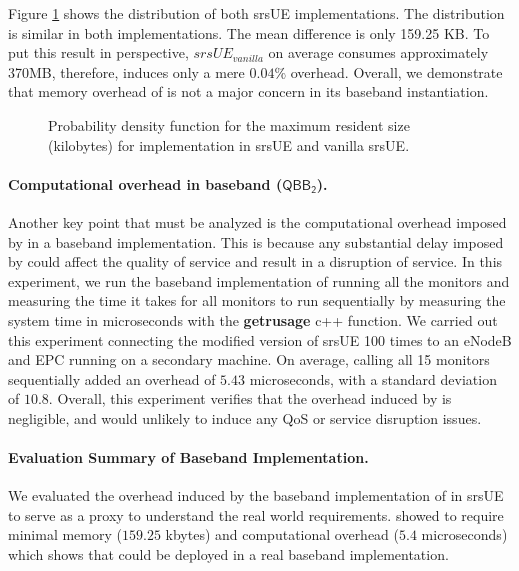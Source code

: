 Figure
\ref{fig:baseband_implementation_memory} shows the distribution of both srsUE
implementations. The
distribution is similar in both implementations. The mean difference is only
159.25 KB.
To
put this result in perspective, $srsUE_{vanilla}$ on average consumes approximately
370MB, therefore, \system induces only a mere $0.04\%$ overhead.
Overall, we demonstrate that memory overhead of \system is not a major concern
in its baseband instantiation.


\begin{figure}[t]
 \centering
 \resizebox{.8\columnwidth}{!}{}
 \caption{Probability density function for the maximum resident size (kilobytes) for \system implementation in srsUE\cite{gomez2016srslte} and vanilla srsUE.}
 \label{fig:baseband_implementation_memory}
\end{figure}
%

\paragraph{Computational overhead in baseband ($\mathsf{QBB_2}$).}
Another key point that must be analyzed is the computational overhead imposed by
\system in a baseband implementation. This is because %
any substantial
delay imposed by \system could affect the quality of service and result in a disruption
of service. In this experiment, we run the baseband implementation of \system running
all the monitors and measuring the time it takes for all monitors to run sequentially
by measuring the system time in microseconds with the \textbf{getrusage} c++ function.
We carried out this experiment connecting the modified version of srsUE 100 times
to an eNodeB and EPC running on a secondary machine. On average, calling all
15 monitors sequentially added an overhead of $5.43$ microseconds, with a
standard deviation of $10.8$. Overall, this experiment verifies that the overhead
induced by \system is negligible, and would unlikely to induce any
QoS or service disruption issues.

\paragraph{Evaluation Summary of Baseband Implementation.}
We evaluated the overhead induced by the baseband
implementation of \system in srsUE to serve as a proxy to understand the
real world requirements. \system showed to require minimal memory ($159.25$ kbytes)
and computational overhead ($5.4$ microseconds) which shows that \system could be deployed in a real baseband
implementation.
